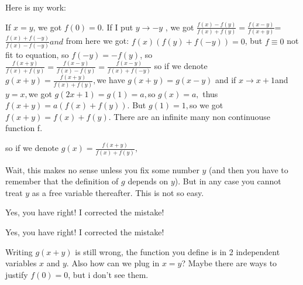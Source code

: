 


\begin{solution}
	\begin{bolded}Here is my work:\end{bolded}
If $x=y$, we got $f(0)=0.$ If I put $y\rightarrow-y$ , we got $\frac{f(x)-f(y)}{f(x)+f(y)}=\frac{f(x-y)}{f(x+y)}$=$\frac{f(x)+f(-y)}{f(x)-f(-y)}and$ from here we got: $f(x)(f(y)+f(-y))=0$, but $f\equiv0$ not fit to equation, so $f(-y)=-f(y)$, so $\frac{f(x+y)}{f(x)+f(y)}=\frac{f(x-y)}{f(x)-f(y)}=\frac{f(x-y)}{f(x)+f(-y)}$ so if we denote $g(x+y)=\frac{f(x+y)}{f(x)+f(y)},$we have $g(x+y)=g(x-y)$ and if $x\rightarrow x+1$and $y=x,$we got $g(2x+1)=g(1)=a,$so $g(x)=a,$ thus $f(x+y)=a(f(x)+f(y))$.  But $g(1)=1,$so we got $f(x+y)=f(x)+f(y).$ There are an infinite many non continuouse function f.
\end{solution}



\begin{solution}
	\begin{tcolorbox}so if we denote $g(x)=\frac{f(x+y)}{f(x)+f(y)},$\end{tcolorbox}
Wait, this makes no sense unless you fix some number $y$ (and then you have to remember that the definition of $g$ depends on $y$). But in any case you cannot treat $y$ as a free variable thereafter. This is not so easy.


\end{solution}



\begin{solution}
	Yes, you have right! I corrected the mistake!
\end{solution}



\begin{solution}
	\begin{tcolorbox}Yes, you have right! I corrected the mistake!\end{tcolorbox}
Writing $g(x + y)$ is still wrong, the function you define is in 2 independent variables $x$ and $y$. Also how can we plug in $x = y$? Maybe there are ways to justify $f(0) = 0$, but i don't see them.
\end{solution}



